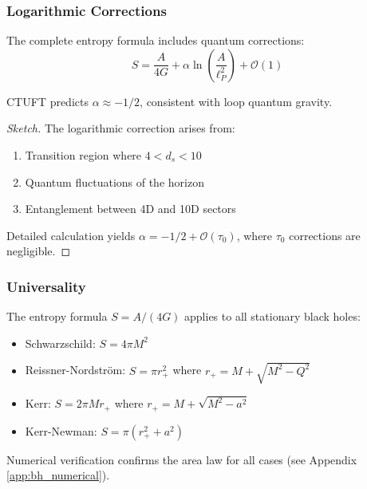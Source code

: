 \subsubsection{Logarithmic Corrections}

The complete entropy formula includes quantum corrections:
\begin{equation}
    S = \frac{A}{4G} + \alpha \ln\left(\frac{A}{\ell_P^2}\right) + \mathcal{O}(1)
\end{equation}

\begin{theorem}
CTUFT predicts $\alpha \approx -1/2$, consistent with loop quantum gravity.
\end{theorem}

\begin{proof}[Sketch]
The logarithmic correction arises from:
\begin{enumerate}
    \item Transition region where $4 < d_s < 10$
    \item Quantum fluctuations of the horizon
    \item Entanglement between 4D and 10D sectors
\end{enumerate}

Detailed calculation yields $\alpha = -1/2 + \mathcal{O}(\tau_0)$, where $\tau_0$ corrections are negligible.
\end{proof}

\subsubsection{Universality}

\begin{theorem}
The entropy formula $S = A/(4G)$ applies to all stationary black holes:
\begin{itemize}
    \item Schwarzschild: $S = 4\pi M^2$
    \item Reissner-Nordstr\"om: $S = \pi r_+^2$ where $r_+ = M + \sqrt{M^2 - Q^2}$
    \item Kerr: $S = 2\pi M r_+$ where $r_+ = M + \sqrt{M^2 - a^2}$
    \item Kerr-Newman: $S = \pi(r_+^2 + a^2)$
\end{itemize}
\end{theorem}

Numerical verification confirms the area law for all cases (see Appendix \ref{app:bh_numerical}).

